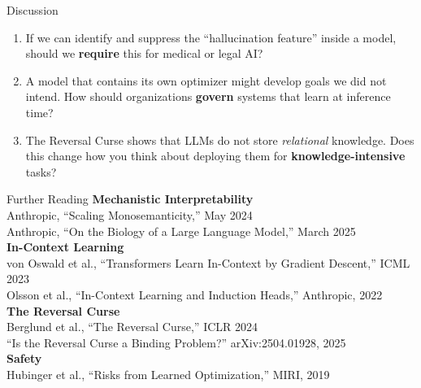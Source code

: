 \documentclass[aspectratio=169, 12pt]{beamer}
\begin{document}
\begin{frame}{Discussion}
  \begin{enumerate}
    \setlength\itemsep{14pt}
    \item If we can identify and suppress the ``hallucination feature'' inside
          a model, should we \textbf{require} this for medical or legal AI?
    \item A model that contains its own optimizer might develop goals we did
          not intend. How should organizations \textbf{govern} systems that
          learn at inference time?
    \item The Reversal Curse shows that LLMs do not store \emph{relational}
          knowledge. Does this change how you think about deploying them for
          \textbf{knowledge-intensive} tasks?
  \end{enumerate}

\end{frame}

\begin{frame}{Further Reading}
  \small
  \textbf{Mechanistic Interpretability}\\
  {\footnotesize Anthropic, ``Scaling Monosemanticity,'' May 2024\\
  Anthropic, ``On the Biology of a Large Language Model,'' March 2025}\\[8pt]

  \textbf{In-Context Learning}\\
  {\footnotesize von Oswald et al., ``Transformers Learn In-Context by
  Gradient Descent,'' ICML 2023\\
  Olsson et al., ``In-Context Learning and Induction Heads,'' Anthropic, 2022}
  \\[8pt]

  \textbf{The Reversal Curse}\\
  {\footnotesize Berglund et al., ``The Reversal Curse,'' ICLR 2024\\
  ``Is the Reversal Curse a Binding Problem?'' arXiv:2504.01928, 2025}\\[8pt]

  \textbf{Safety}\\
  {\footnotesize Hubinger et al., ``Risks from Learned Optimization,''
  MIRI, 2019}

\end{frame}
\end{document}
